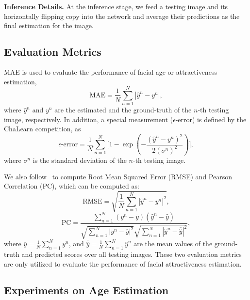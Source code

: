 \documentclass[5p,times,twocolumn]{elsarticle}
\begin{document}
\textbf{Inference Details.} At the inference stage, we feed a testing image and its horizontally flipping copy into the network and average their predictions as the final estimation for the image.
\vspace{-8pt}

\subsection{Evaluation Metrics}
MAE is used to evaluate the performance of facial age or attractiveness estimation,
\begin{equation}
\text{MAE} = \frac{1}{N}\sum_{n=1}^{N}|\hat y^n - y^n|,
\end{equation}
where $\hat y^n$ and  $y^n$ are the estimated and the ground-truth of the $n$-th testing image, respectively. In addition, a special measurement ($\epsilon$-error) is defined by the ChaLearn competition, as
\begin{equation}
\epsilon\text{-error} = \frac{1}{N}\sum_{n=1}^N \Bigg[1 - \exp\left(-\frac{(\hat{y}^n- y^n)^2}{2(\sigma^n)^2}\right)\Bigg],   \label{eq-me}
\end{equation}
where $\sigma^n$ is the standard deviation of the $n$-th testing image.

We also follow~\cite{xie2015scut,fan2017label} to compute Root Mean Squared Error (RMSE) and Pearson Correlation (PC), which can be computed as:
\begin{equation}
\text{RMSE} = \sqrt{\frac{1}{N}\sum_{n=1}^{N}{|\hat y^n - y^n|}^2},
\end{equation}
\begin{equation}
\text{PC} = \frac{\sum_{n=1}^{N}(y^n-\overline y)(\hat y^n-\overline{\hat y})}{\sqrt{\sum_{n=1}^{N}{|y^n - \overline y|}^2}\sqrt{\sum_{n=1}^{N}{|\hat y^n - \overline{\hat y}|}^2}},
\end{equation}
where $\overline y = \frac{1}{N}\sum_{n=1}^{N}{y^n}$, and $\overline {\hat y} = \frac{1}{N}\sum_{n=1}^{N}{{\hat y}^n}$ are the mean values of the ground-truth and predicted scores over all testing images. These two evaluation metrics are only utilized to evaluate the performance of facial attractiveness estimation. 

\subsection{Experiments on Age Estimation}\label{sec:eage}
\end{document}
